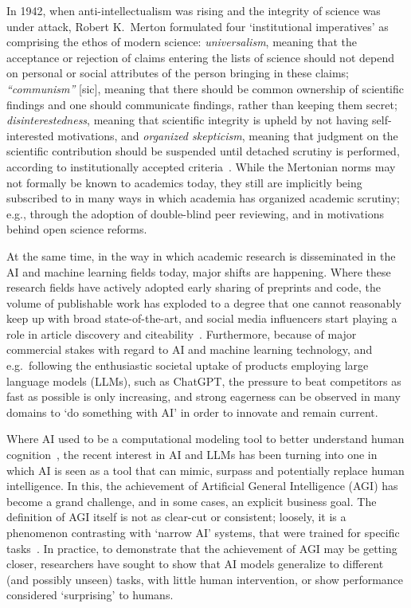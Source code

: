 \documentclass{article}
\theoremstyle{plain}
\theoremstyle{definition}
\theoremstyle{remark}
\begin{document}
In 1942, when anti-intellectualism was rising and the integrity of science was under attack, Robert K.\ Merton formulated four `institutional imperatives' as comprising the ethos of modern science: \emph{universalism}, meaning that the acceptance or rejection of claims entering the lists of science should not depend on personal or social attributes of the person bringing in these claims; \emph{``communism''} [sic], meaning that there should be common ownership of scientific findings and one should communicate findings, rather than keeping them secret; \emph{disinterestedness}, meaning that scientific integrity is upheld by not having self-interested motivations, and \emph{organized skepticism}, meaning that judgment on the scientific contribution should be suspended until detached scrutiny is performed, according to institutionally accepted criteria~\cite{merton1942science}. While the Mertonian norms may not formally be known to academics today, they still are implicitly being subscribed to in many ways in which academia has organized academic scrutiny; e.g., through the adoption of double-blind peer reviewing, and in motivations behind open science reforms.

At the same time, in the way in which academic research is disseminated in the AI and machine learning fields today, major shifts are happening. Where these research fields have actively adopted early sharing of preprints and code, the volume of publishable work has exploded to a degree that one cannot reasonably keep up with broad state-of-the-art, and social media influencers start playing a role in article discovery and citeability~\cite{weissburg2024tweets}. Furthermore, because of major commercial stakes with regard to AI and machine learning technology, and e.g.\ following the enthusiastic societal uptake of products employing large language models (LLMs), such as ChatGPT, the pressure to beat competitors as fast as possible is only increasing, and strong eagerness can be observed in many domains to `do something with AI' in order to innovate and remain current.

Where AI used to be a computational modeling tool to better understand human cognition~\cite{vanrooij2023aitheoretical}, the recent interest in AI and LLMs has been turning into one in which AI is seen as a tool that can mimic, surpass and potentially replace human intelligence. In this, the achievement of Artificial General Intelligence (AGI) has become a grand challenge, and in some cases, an explicit business goal. The definition of AGI itself is not as clear-cut or consistent; loosely, it is a phenomenon contrasting with `narrow AI' systems, that were trained for specific tasks~\cite{bubeck2023sparks}. In practice, to demonstrate that the achievement of AGI may be getting closer, researchers have sought to show that AI models generalize to different (and possibly unseen) tasks, with little human intervention, or show performance considered `surprising' to humans.
\end{document}
